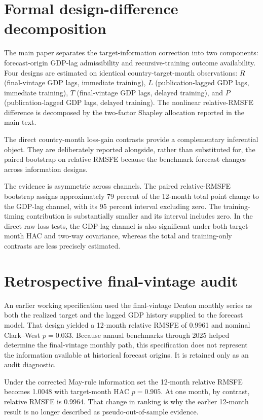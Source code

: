 \documentclass[12pt]{article}
\begin{document}
\section{Formal design-difference decomposition}
The main paper separates the target-information correction into two components: forecast-origin GDP-lag admissibility and recursive-training outcome availability. Four designs are estimated on identical country-target-month observations: $R$ (final-vintage GDP lags, immediate training), $L$ (publication-lagged GDP lags, immediate training), $T$ (final-vintage GDP lags, delayed training), and $P$ (publication-lagged GDP lags, delayed training). The nonlinear relative-RMSFE difference is decomposed by the two-factor Shapley allocation reported in the main text.



The direct country-month loss-gain contrasts provide a complementary inferential object. They are deliberately reported alongside, rather than substituted for, the paired bootstrap on relative RMSFE because the benchmark forecast changes across information designs.



The evidence is asymmetric across channels. The paired relative-RMSFE bootstrap assigns approximately 79 percent of the 12-month total point change to the GDP-lag channel, with its 95 percent interval excluding zero. The training-timing contribution is substantially smaller and its interval includes zero. In the direct raw-loss tests, the GDP-lag channel is also significant under both target-month HAC and two-way covariance, whereas the total and training-only contrasts are less precisely estimated.


\section{Retrospective final-vintage audit}
An earlier working specification used the final-vintage Denton monthly series as both the realized target and the lagged GDP history supplied to the forecast model. That design yielded a 12-month relative RMSFE of 0.9961 and nominal Clark--West $p=0.033$. Because annual benchmarks through 2025 helped determine the final-vintage monthly path, this specification does not represent the information available at historical forecast origins. It is retained only as an audit diagnostic.

Under the corrected May-rule information set the 12-month relative RMSFE becomes 1.0048 with target-month HAC $p=0.905$. At one month, by contrast, relative RMSFE is 0.9964. That change in ranking is why the earlier 12-month result is no longer described as pseudo-out-of-sample evidence.
\end{document}
